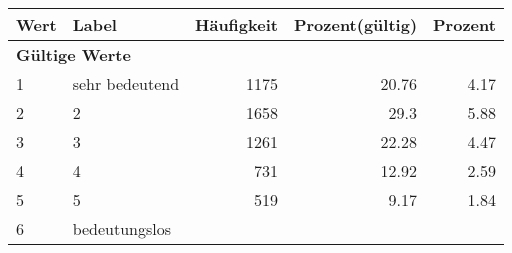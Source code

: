      \begin{longtable}{lXrrr}
     \toprule
     \textbf{Wert} & \textbf{Label} & \textbf{Häufigkeit} & \textbf{Prozent(gültig)} & \textbf{Prozent} \\
     \endhead
     \midrule
     \multicolumn{5}{l}{\textbf{Gültige Werte}}\\

     1 &
     \multicolumn{1}{X}{ sehr bedeutend   } &


       \num{1175} &
       \num[round-mode=places,round-precision=2]{20.76} &
         \num[round-mode=places,round-precision=2]{4.17} \\

     2 &
     \multicolumn{1}{X}{ 2   } &


       \num{1658} &
       \num[round-mode=places,round-precision=2]{29.3} &
         \num[round-mode=places,round-precision=2]{5.88} \\

     3 &
     \multicolumn{1}{X}{ 3   } &


       \num{1261} &
       \num[round-mode=places,round-precision=2]{22.28} &
         \num[round-mode=places,round-precision=2]{4.47} \\

     4 &
     \multicolumn{1}{X}{ 4   } &


       \num{731} &
       \num[round-mode=places,round-precision=2]{12.92} &
         \num[round-mode=places,round-precision=2]{2.59} \\

     5 &
     \multicolumn{1}{X}{ 5   } &


       \num{519} &
       \num[round-mode=places,round-precision=2]{9.17} &
         \num[round-mode=places,round-precision=2]{1.84} \\

     6 &
     \multicolumn{1}{X}{ bedeutungslos   } &



\end{longtable}
